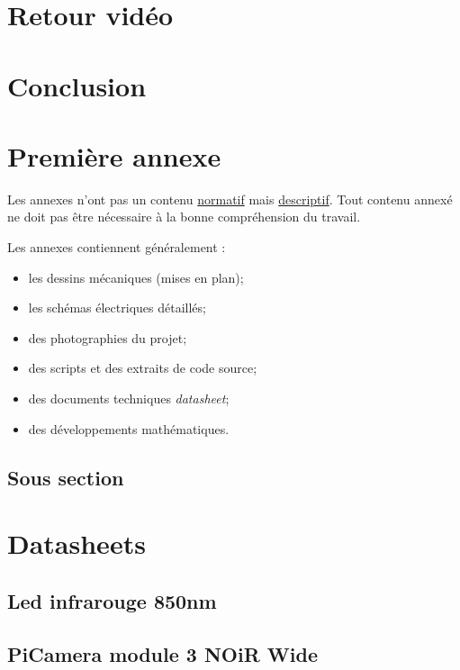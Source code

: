 \documentclass[
    iai, %
    eai, %
]{heig-tb}
\begin{document}
\chapter{Retour vidéo}


\chapter{Conclusion}


\clearpage
\printbibliography

\appendix
\appendixpage
\addappheadtotoc

\chapter{Première annexe}

Les annexes n'ont pas un contenu \underline{normatif} mais \underline{descriptif}. Tout contenu annexé ne doit pas être nécessaire à la bonne compréhension du travail.

Les annexes contiennent généralement :

\begin{itemize}
    \item les dessins mécaniques (mises en plan);
    \item les schémas électriques détaillés;
    \item des photographies du projet;
    \item des scripts et des extraits de code source;
    \item des documents techniques \pex \emph{datasheet};
    \item des développements mathématiques.
\end{itemize}
\section{Sous section}
\lipsum[1]

\chapter{Datasheets}
\section{Led infrarouge 850nm}

\section{PiCamera module 3 NOiR Wide}

\end{document}
